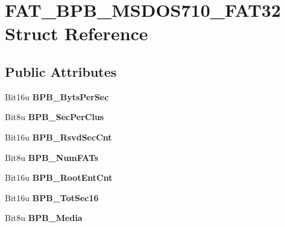 \hypertarget{structFAT__BPB__MSDOS710__FAT32}{\section{F\-A\-T\-\_\-\-B\-P\-B\-\_\-\-M\-S\-D\-O\-S710\-\_\-\-F\-A\-T32 Struct Reference}
\label{structFAT__BPB__MSDOS710__FAT32}
}
\subsection*{Public Attributes}
\begin{DoxyCompactItemize}
\item 
\hypertarget{structFAT__BPB__MSDOS710__FAT32_a26005afc49d8acd78b29048be62b69a8}{Bit16u {\bfseries B\-P\-B\-\_\-\-Byts\-Per\-Sec}}\label{structFAT__BPB__MSDOS710__FAT32_a26005afc49d8acd78b29048be62b69a8}

\item 
\hypertarget{structFAT__BPB__MSDOS710__FAT32_a35d14599ad0256a80239a8b9119b8d97}{Bit8u {\bfseries B\-P\-B\-\_\-\-Sec\-Per\-Clus}}\label{structFAT__BPB__MSDOS710__FAT32_a35d14599ad0256a80239a8b9119b8d97}

\item 
\hypertarget{structFAT__BPB__MSDOS710__FAT32_ad5acea898914df63f04b1e453be46ba4}{Bit16u {\bfseries B\-P\-B\-\_\-\-Rsvd\-Sec\-Cnt}}\label{structFAT__BPB__MSDOS710__FAT32_ad5acea898914df63f04b1e453be46ba4}

\item 
\hypertarget{structFAT__BPB__MSDOS710__FAT32_ade82915583bc9b8570b457291d8fb1f5}{Bit8u {\bfseries B\-P\-B\-\_\-\-Num\-F\-A\-Ts}}\label{structFAT__BPB__MSDOS710__FAT32_ade82915583bc9b8570b457291d8fb1f5}

\item 
\hypertarget{structFAT__BPB__MSDOS710__FAT32_ac3fd4ef01392f40c8edd8dc70d7b1103}{Bit16u {\bfseries B\-P\-B\-\_\-\-Root\-Ent\-Cnt}}\label{structFAT__BPB__MSDOS710__FAT32_ac3fd4ef01392f40c8edd8dc70d7b1103}

\item 
\hypertarget{structFAT__BPB__MSDOS710__FAT32_ac30a0f6b07839e8e5097720bcd504d51}{Bit16u {\bfseries B\-P\-B\-\_\-\-Tot\-Sec16}}\label{structFAT__BPB__MSDOS710__FAT32_ac30a0f6b07839e8e5097720bcd504d51}

\item 
\hypertarget{structFAT__BPB__MSDOS710__FAT32_a318c6cf9559fce41f4e7920baf43824e}{Bit8u {\bfseries B\-P\-B\-\_\-\-Media}}\label{structFAT__BPB__MSDOS710__FAT32_a318c6cf9559fce41f4e7920baf43824e}


\end{DoxyCompactItemize}
